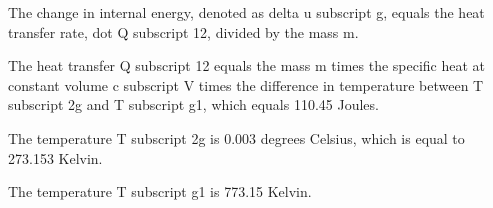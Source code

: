 The change in internal energy, denoted as delta u subscript g, equals the heat transfer rate, dot Q subscript 12, divided by the mass m.

The heat transfer Q subscript 12 equals the mass m times the specific heat at constant volume c subscript V times the difference in temperature between T subscript 2g and T subscript g1, which equals 110.45 Joules.

The temperature T subscript 2g is 0.003 degrees Celsius, which is equal to 273.153 Kelvin.

The temperature T subscript g1 is 773.15 Kelvin.